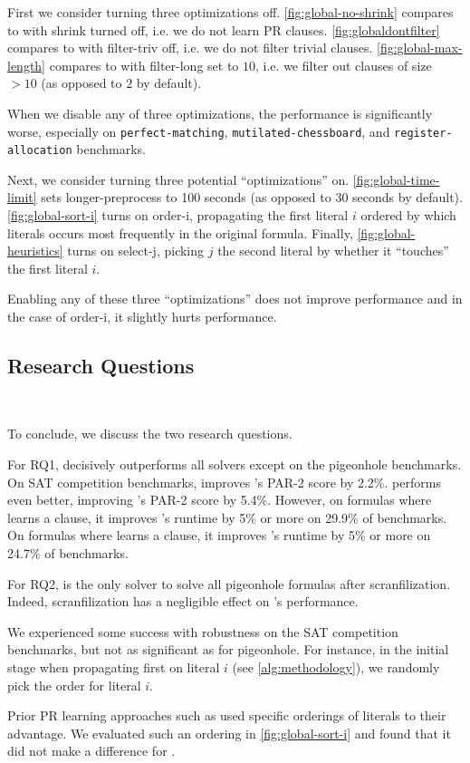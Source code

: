 First we consider turning three optimizations off.
\autoref{fig:global-no-shrink} compares \tool to \tool with
\textsf{shrink} turned off, i.e. we do not learn PR clauses.
\autoref{fig:globaldontfilter} compares \tool to \tool with
\textsf{filter-triv} off, i.e. we do not filter trivial clauses.
\autoref{fig:global-max-length} compares \tool to \tool with
\textsf{filter-long} set to $10$, i.e. we filter out clauses of size $> 10$ (as
opposed to $2$ by default).

When we disable any of three optimizations, the performance is significantly
worse, especially on \texttt{perfect-matching}, \texttt{mutilated-chessboard},
and \texttt{register-allocation} benchmarks.

Next, we consider turning three potential ``optimizations'' on.
\autoref{fig:global-time-limit} sets \textsf{longer-preprocess} to 100 seconds
(as opposed to 30 seconds by default). \autoref{fig:global-sort-i} turns on
\textsf{order-i}, propagating the first literal $i$ ordered by which literals
occurs most frequently in the original formula. Finally,
\autoref{fig:global-heuristics} turns on \textsf{select-j}, picking $j$ the
second literal by whether it ``touches'' the first literal $i$.

Enabling any of these three ``optimizations'' does not improve performance and
in the case of \textsf{order-i}, it slightly hurts performance.

\subsection{Research Questions}~\label{subsec:researchquestions}

To conclude, we discuss the two research questions. 

For RQ1, \tool decisively outperforms all solvers except \sadical on the
pigeonhole benchmarks. On SAT competition benchmarks, \tool improves \cadical's
PAR-2 score by 2.2\%. \prelearn performs even better, improving \cadical's PAR-2
score by 5.4\%. However, on formulas where \tool learns a \pr clause, it improves
\cadical's runtime by 5\% or more on 29.9\% of benchmarks. On formulas where \prelearn 
learns a \pr clause, it improves \cadical's runtime by 5\% or more on 24.7\% of benchmarks.
 
For RQ2, \tool is the only solver to solve all pigeonhole formulas after
scranfilization. Indeed, scranfilization has a negligible effect on \tool's
performance.

We experienced some success with robustness on the SAT competition benchmarks,
but not as significant as for pigeonhole. For instance, in the initial stage
when propagating first on literal $i$ (see \autoref{alg:methodology}), we
randomly pick the order for literal $i$.

Prior PR learning approaches such as \prelearn used specific orderings of
literals to their advantage. We evaluated such an ordering in
\autoref{fig:global-sort-i} and found that it did not make a difference for
\tool.

